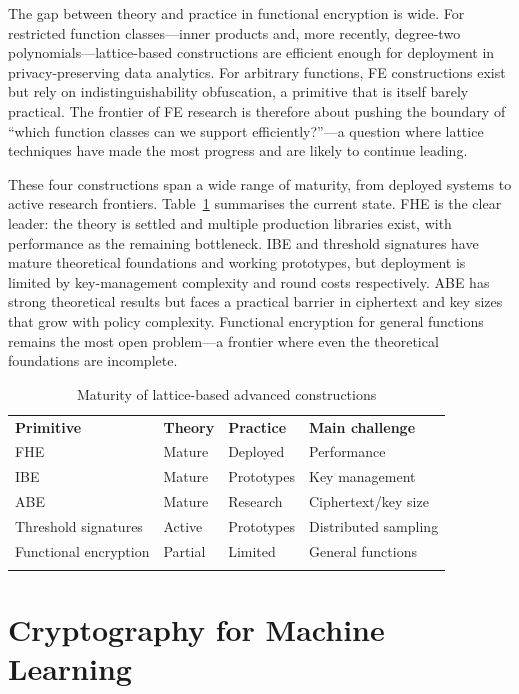 The gap between theory and practice in functional encryption is wide.  For restricted function classes---inner products and, more recently, degree-two polynomials---lattice-based constructions are efficient enough for deployment in privacy-preserving data analytics.  For arbitrary functions, FE constructions exist but rely on indistinguishability obfuscation, a primitive that is itself barely practical.  The frontier of FE research is therefore about pushing the boundary of ``which function classes can we support efficiently?''---a question where lattice techniques have made the most progress and are likely to continue leading.

These four constructions span a wide range of maturity, from deployed systems to active research frontiers.  Table~\ref{tab:advanced-maturity} summarises the current state.  FHE is the clear leader: the theory is settled and multiple production libraries exist, with performance as the remaining bottleneck.  IBE and threshold signatures have mature theoretical foundations and working prototypes, but deployment is limited by key-management complexity and round costs respectively.  ABE has strong theoretical results but faces a practical barrier in ciphertext and key sizes that grow with policy complexity.  Functional encryption for general functions remains the most open problem---a frontier where even the theoretical foundations are incomplete.

\begin{table}[t]
\caption{Maturity of lattice-based advanced constructions}
\label{tab:advanced-maturity}
\begin{tabular}{p{3.5cm}p{2.5cm}p{2.5cm}p{3cm}}
\hline\noalign{\smallskip}
\textbf{Primitive} & \textbf{Theory} & \textbf{Practice} & \textbf{Main challenge} \\
\noalign{\smallskip}\svhline\noalign{\smallskip}
FHE & Mature & Deployed & Performance \\
IBE & Mature & Prototypes & Key management \\
ABE & Mature & Research & Ciphertext/key size \\
Threshold signatures & Active & Prototypes & Distributed sampling \\
Functional encryption & Partial & Limited & General functions \\
\noalign{\smallskip}\hline
\end{tabular}
\end{table}


\section{Cryptography for Machine Learning}
\label{sec:crypto-ml}

